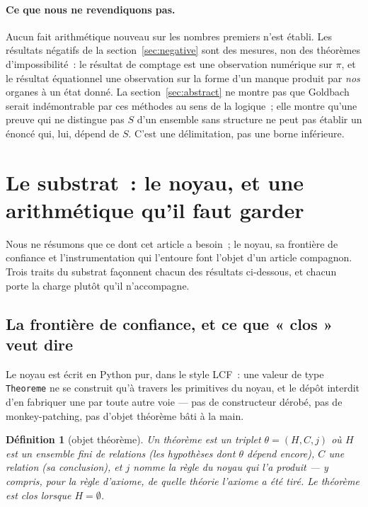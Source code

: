 \documentclass[11pt]{article}
\newtheorem{definition}{Définition}
\theoremstyle{remark}\newtheorem{remarque}{Remarque}
\begin{document}
\paragraph{Ce que nous ne revendiquons pas.} Aucun fait arithmétique nouveau sur les
nombres premiers n'est établi. Les résultats négatifs de la section~\ref{sec:negative}
sont des mesures, non des théorèmes d'impossibilité~: le résultat de comptage est une
observation numérique sur $\pi$, et le résultat équationnel une observation sur la forme
d'un manque produit par \emph{nos} organes à un état donné. La
section~\ref{sec:abstract} ne montre pas que Goldbach serait indémontrable par ces
méthodes au sens de la logique~; elle montre qu'une preuve qui ne distingue pas $S$ d'un
ensemble sans structure ne peut pas établir un énoncé qui, lui, dépend de $S$. C'est une
délimitation, pas une borne inférieure.

\section{Le substrat~: le noyau, et une arithmétique qu'il faut garder}
\label{sec:background}

Nous ne résumons que ce dont cet article a besoin~; le noyau, sa frontière de confiance
et l'instrumentation qui l'entoure font l'objet d'un article compagnon. Trois traits du
substrat façonnent chacun des résultats ci-dessous, et chacun porte la charge plutôt
qu'il n'accompagne.

\subsection{La frontière de confiance, et ce que « clos » veut dire}

Le noyau est écrit en Python pur, dans le style LCF~: une valeur de type
\texttt{Theoreme} ne se construit qu'à travers les primitives du noyau, et le dépôt
interdit d'en fabriquer une par toute autre voie --- pas de constructeur dérobé, pas de
monkey-patching, pas d'objet théorème bâti à la main.

\begin{definition}[objet théorème]\label{def:theoreme}
Un \emph{théorème} est un triplet $\theta = (H, C, j)$ où $H$ est un ensemble fini de
relations (les \emph{hypothèses} dont $\theta$ dépend encore), $C$ une relation (sa
\emph{conclusion}), et $j$ nomme la règle du noyau qui l'a produit --- y compris, pour la
règle d'axiome, \emph{de quelle théorie l'axiome a été tiré}. Le théorème est \emph{clos}
lorsque $H = \emptyset$.
\end{definition}
\end{document}
